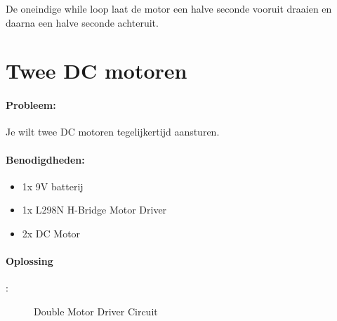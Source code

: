 De oneindige while loop laat de motor een halve seconde vooruit draaien en daarna een halve seconde achteruit.



\section{Twee DC motoren}\label{sec:TwoDCMotors}
	\paragraph{Probleem:} Je wilt twee DC motoren tegelijkertijd aansturen.
	
	\paragraph{Benodigdheden:}
	\begin{itemize}
		\item 1x 9V batterij
		\item 1x L298N H-Bridge Motor Driver
		\item 2x DC Motor
	\end{itemize}
	
	\paragraph{Oplossing}: 
	
	
	\begin{figure}[H]
		\caption{Double Motor Driver Circuit}
		\label{fig:Two_DC_Motor}
	\end{figure}

